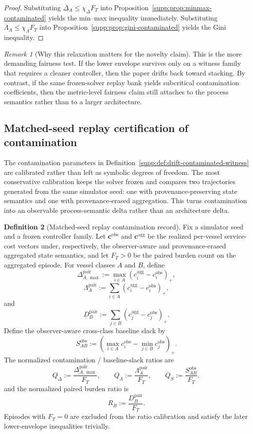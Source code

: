 \documentclass[11pt]{article}
\newcommand{\1}{\mathbf{1}}
\theoremstyle{definition}
\newtheorem{definition}{Definition}[section]
\theoremstyle{plain}
\theoremstyle{remark}
\newtheorem{remark}[definition]{Remark}
\begin{document}
\begin{proof}
Substituting $\overline\Delta_A \le \chi_\Delta F_T$ into Proposition~\ref{supp:prop:minmax-contaminated} yields the min--max inequality immediately. Substituting $\overline\Lambda_A \le \chi_\Lambda F_T$ into Proposition~\ref{supp:prop:gini-contaminated} yields the Gini inequality.
\end{proof}

\begin{remark}[Why this relaxation matters for the novelty claim]
\label{supp:rem:relaxed-witness-novelty}
This is the more demanding fairness test. If the lower envelope survives only on a witness family that requires a cleaner controller, then the paper drifts back toward stacking. By contrast, if the same frozen-solver replay bank yields subcritical contamination coefficients, then the metric-level fairness claim still attaches to the process semantics rather than to a larger architecture.
\end{remark}

\subsection{Matched-seed replay certification of contamination}
\label{supp:subsec:matched-seed-contamination}

The contamination parameters in Definition~\ref{supp:def:drift-contaminated-witness} are calibrated rather than left as symbolic degrees of freedom. The most conservative calibration keeps the solver frozen and compares two trajectories generated from the same simulator seed: one with provenance-preserving state semantics and one with provenance-erased aggregation. This turns contamination into an observable process-semantic delta rather than an architecture delta.

\begin{definition}[Matched-seed replay contamination record]
\label{supp:def:matched-seed-contam-record}
Fix a simulator seed and a frozen controller family. Let $\mathbf c^{\mathrm{obs}}$ and $\mathbf c^{\mathrm{agg}}$ be the realized per-vessel service-cost vectors under, respectively, the observer-aware and provenance-erased aggregated state semantics, and let $F_T>0$ be the paired burden count on the aggregated episode. For vessel classes $A$ and $B$, define
\[
\Delta_{A,\max}^{\mathrm{pair}}
:=
\max_{i\in A} (c_i^{\mathrm{agg}} - c_i^{\mathrm{obs}})_+,
\]
\[
\Lambda_A^{\mathrm{pair}}
:=
\sum_{i\in A} (c_i^{\mathrm{agg}} - c_i^{\mathrm{obs}})_+,
\]
and
\[
D_B^{\mathrm{pair}}
:=
\sum_{j\in B} (c_j^{\mathrm{agg}} - c_j^{\mathrm{obs}})_+.
\]
Define the observer-aware cross-class baseline slack by
\[
S_{AB}^{\mathrm{obs}}
:=
\left(
\max_{i\in A} c_i^{\mathrm{obs}} - \min_{j\in B} c_j^{\mathrm{obs}}
\right)_+.
\]
The normalized contamination / baseline-slack ratios are
\[
Q_\Delta := \frac{\Delta_{A,\max}^{\mathrm{pair}}}{F_T},
\qquad
Q_\Lambda := \frac{\Lambda_A^{\mathrm{pair}}}{F_T},
\qquad
Q_S := \frac{S_{AB}^{\mathrm{obs}}}{F_T},
\]
and the normalized paired burden ratio is
\[
R_B := \frac{D_B^{\mathrm{pair}}}{F_T}.
\]
Episodes with $F_T=0$ are excluded from the ratio calibration and satisfy the later lower-envelope inequalities trivially.
\end{definition}
\end{document}
